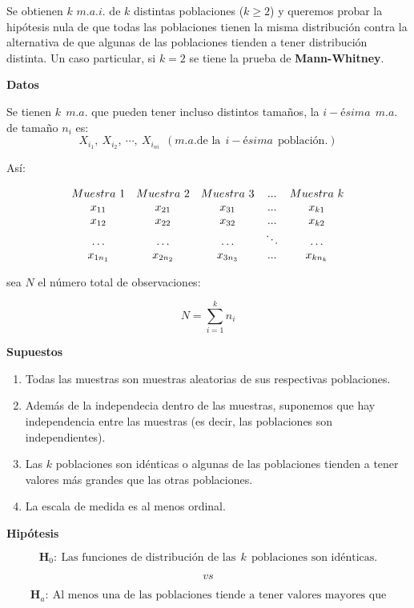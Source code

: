 \documentclass[
  a4paper,
  oneside,
  openany]{book}
\begin{document}
Se obtienen \(k\) \(m.a.i.\) de \(k\) distintas poblaciones (\(k\geq 2\)) y queremos probar la hipótesis nula de que todas las poblaciones tienen la misma distribución contra la alternativa de que algunas de las poblaciones tienden a tener distribución distinta.
Un caso particular, si \(k=2\) se tiene la prueba de \textbf{Mann-Whitney}.

\textbf{Datos}

Se tienen \(k\ \ m.a.\) que pueden tener incluso distintos tamaños, la \(i-ésima\ \ m.a.\) de tamaño \(n_{i}\) es:
\[X_{i_1},\ X_{i_2},\ \cdots, \ X_{i_{ni}} \ \ (m.a. \mbox{de la} \ \ i-ésima \ \ \mbox{población.})\]

Así:

\[
\begin{array}{c c c c c} 
Muestra \ 1&Muestra\ 2&Muestra\ 3&...&Muestra\ k \\
x_{11}&x_{21}&x_{31}&...&x_{k1}\\
x_{12}&x_{22}&x_{32}&...&x_{k2}\\
\ldots&\ldots&\ldots&\ddots&\ldots\\
x_{1n_1}&x_{2n_2}&x_{3n_3}&...&x_{kn_k}\\
\end{array}
\]

sea \(N\) el número total de observaciones:

\[ N= \sum_{i=1}^{k} n_{i}\]

\textbf{Supuestos}

\begin{enumerate}
\def\labelenumi{\arabic{enumi})}
\item
  Todas las muestras son muestras aleatorias de sus respectivas poblaciones.
\item
  Además de la independecia dentro de las muestras, suponemos que hay independencia entre las muestras (es decir, las poblaciones son independientes).
\item
  Las \(k\) poblaciones son idénticas o algunas de las poblaciones tienden a tener valores más grandes que las otras poblaciones.
\item
  La escala de medida es al menos ordinal.
\end{enumerate}

\textbf{Hipótesis}

\[\textbf{H}_0: \ \mbox{Las funciones de distribución de las} \ \  k \ \ \mbox{poblaciones son idénticas.}\]

\[vs\]

\[\textbf{H}_a: \ \mbox{Al menos una de las poblaciones tiende a tener valores mayores que}\]
\end{document}
